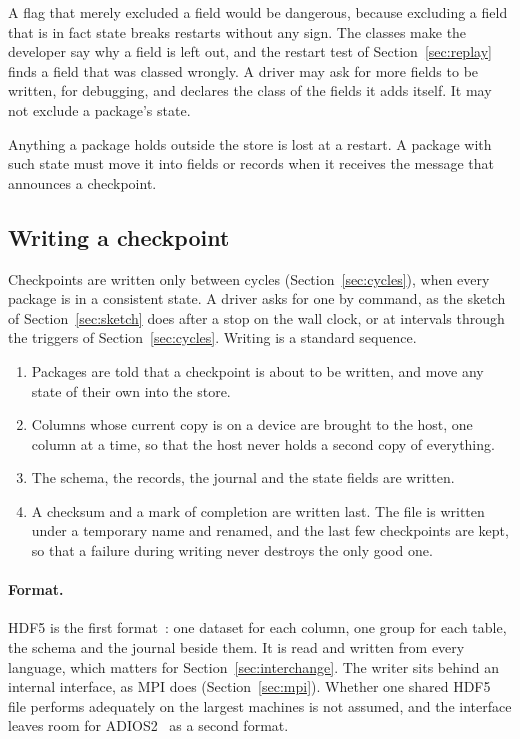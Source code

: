 \documentclass[11pt,a4paper]{article}
\begin{document}
A flag that merely excluded a field would be dangerous, because excluding a
field that is in fact state breaks restarts without any sign.  The classes
make the developer say why a field is left out, and the restart test of
Section~\ref{sec:replay} finds a field that was classed wrongly.  A driver
may ask for more fields to be written, for debugging, and declares the
class of the fields it adds itself.  It may not exclude a package's state.

Anything a package holds outside the store is lost at a restart.  A package
with such state must move it into fields or records when it receives the
message that announces a checkpoint.

\subsection{Writing a checkpoint}

Checkpoints are written only between cycles (Section~\ref{sec:cycles}),
when every package is in a consistent state.  A driver asks for one by
command, as the sketch of Section~\ref{sec:sketch} does after a stop on the
wall clock, or at intervals through the triggers of
Section~\ref{sec:cycles}.  Writing is a standard sequence.

\begin{enumerate}
  \item Packages are told that a checkpoint is about to be written, and
        move any state of their own into the store.
  \item Columns whose current copy is on a device are brought to the host,
        one column at a time, so that the host never holds a second copy of
        everything.
  \item The schema, the records, the journal and the state fields are
        written.
  \item A checksum and a mark of completion are written last.  The file is
        written under a temporary name and renamed, and the last few
        checkpoints are kept, so that a failure during writing never
        destroys the only good one.
\end{enumerate}

\paragraph{Format.}  HDF5 is the first format~\cite{hdf5}: one dataset for
each column, one group for each table, the schema and the journal beside
them.  It is read and written from every language, which matters for
Section~\ref{sec:interchange}.  The writer sits behind an internal
interface, as MPI does (Section~\ref{sec:mpi}).  Whether one shared HDF5
file performs adequately on the largest machines is not assumed, and the
interface leaves room for ADIOS2~\cite{adios2} as a second format.
\end{document}
